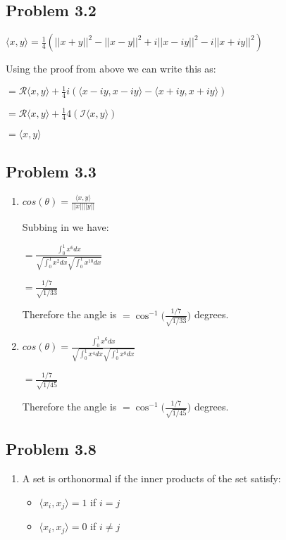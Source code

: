 \documentclass[letterpaper,12pt]{article}
\theoremstyle{definition}
\begin{document}
\begin{spacing}{1.3}{}
	
\subsection*{Problem 3.2}
	
	\setlength{\leftskip}{20pt}
	
	$\langle x, y \rangle = \frac{1}{4}(||x + y||^2 - ||x - y||^2 + i||x - iy||^2 - i||x + iy||^2)$
	
	Using the proof from above we can write this as:
	
	$= \mathcal{R} \langle x, y \rangle +\frac{1}{4}i(\langle x-iy, x-iy \rangle - \langle x+iy, x+iy \rangle)$
	
	$= \mathcal{R} \langle x, y \rangle +\frac{1}{4}4( \mathcal{I} \langle x, y \rangle)$
	
	$= \langle x, y \rangle$
	
	\setlength{\leftskip}{0pt}
	
\subsection*{Problem 3.3}

\begin{enumerate}
  \item 
  $cos(\theta) = \frac{\langle x, y \rangle}{||x|| ||y||}$
	
	Subbing in we have:
	
	$= \frac{\int_{0}^{1} x^6 dx}{\sqrt{\int_{0}^{1} x^2 dx}\sqrt{\int_{0}^{1} x^10 dx}}$
	
	$= \frac{1/7}{\sqrt{1/33}}$
	
	Therefore the angle is $= \cos^{-1} \bigg(\frac{1/7}{\sqrt{1/33}}\bigg)$ degrees.
  \item
  $cos(\theta) = \frac{\int_{0}^{1}x^6 dx}{\sqrt{\int_{0}^{1}x^4 dx}\sqrt{\int_{0}^{1}x^8 dx}}$
	
	$= \frac{1/7}{\sqrt{1/45}}$
	
	Therefore the angle is $= \cos^{-1} \bigg(\frac{1/7}{\sqrt{1/45}}\bigg)$ degrees.

\end{enumerate}
	
	
\subsection*{Problem 3.8}

\begin{enumerate}
  \item
  	A set is orthonormal if the inner products of the set satisfy: \begin{itemize} \item $\langle x_{i}, x_{j} \rangle = 1$ if $i=j$ \item $\langle x_{i}, x_{j} \rangle = 0$ if $i \neq j$ \end{itemize}
	

\end{enumerate}
\end{spacing}
\end{document}
